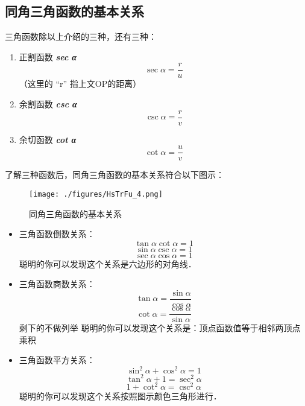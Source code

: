 \subsection{同角三角函数的基本关系}
三角函数除以上介绍的三种，还有三种：
\begin{enumerate}
\item 正割函数 \textbf{\textsl{sec α}} 
\begin{equation}
\sec \alpha = \frac{r}{u}
\end{equation}
（这里的 “r” 指上文OP的距离）
\item 余割函数 \textbf{\textsl{csc α}} 
\begin{equation}
\csc \alpha = \frac{r}{v}
\end{equation}
\item 余切函数 \textbf{\textsl{cot α}} 
\begin{equation}
\cot \alpha = \frac{u}{v}
\end{equation}
\end{enumerate}
了解三种函数后，同角三角函数的基本关系符合以下图示：
\begin{figure}[ht]
\centering
\texttt{[image: ./figures/HsTrFu\_4.png]}
\caption{同角三角函数的基本关系} \label{HsTrFu_fig4}
\end{figure}
\begin{itemize}
\item 三角函数倒数关系：
\begin{equation}
\tan \alpha  \cot \alpha = 1
\end{equation}
\begin{equation}
\sin \alpha  \csc \alpha = 1
\end{equation}
\begin{equation}
\sec \alpha  \cos \alpha = 1
\end{equation}
聪明的你可以发现这个关系是六边形的对角线．
\item 三角函数商数关系：
\begin{equation}
\tan \alpha = \frac{\sin \alpha}{\cos \alpha}
\end{equation}
\begin{equation}
\cot \alpha = \frac{\cos \alpha}{\sin \alpha}
\end{equation}
剩下的不做列举
聪明的你可以发现这个关系是：顶点函数值等于相邻两顶点乘积
\item 三角函数平方关系：
\begin{equation}
\sin ^{2} \alpha + \cos ^{2}\alpha =1
\end{equation}
\begin{equation}
\tan  ^{2} \alpha + 1 =\sec ^{2}\alpha
\end{equation}
\begin{equation}
1 + \cot ^{2}\alpha =\csc ^{2}\alpha
\end{equation}
聪明的你可以发现这个关系按照图示颜色三角形进行．
\end{itemize}
